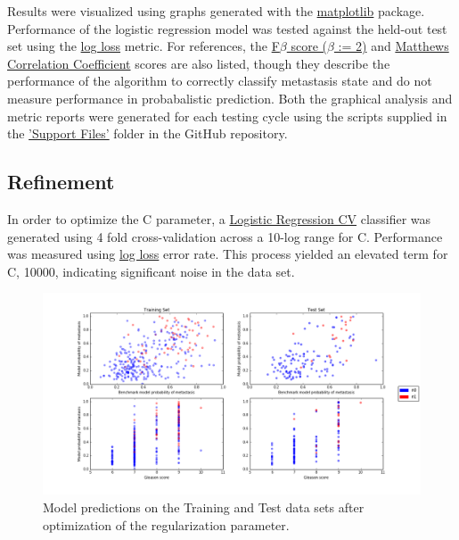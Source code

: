 \documentclass[final]{article}
\begin{document}
Results were visualized using graphs generated with the
\href{http://matplotlib.org/index.html}{matplotlib} package.  Performance of the
logistic regression model was tested against the held-out test set using the
\href{http://scikit-learn.org/stable/modules/generated/sklearn.metrics.log_loss.html#sklearn.metrics.log_loss}{log
loss} metric.  For references, the
\href{http://scikit-learn.org/stable/modules/generated/sklearn.metrics.fbeta_score.html}{F$\beta$
score ($\beta$ := 2)} and
\href{http://scikit-learn.org/stable/modules/generated/sklearn.metrics.matthews_corrcoef.html}{Matthews
Correlation Coefficient} scores are also listed, though they describe the
performance of the algorithm to correctly classify metastasis state and do not
measure performance in probabalistic prediction.  Both the graphical analysis
and metric reports were generated for each testing cycle using the scripts
supplied in the
\href{https://github.com/CCThompson82/MLE_capstone/tree/master/Support%20Files}{'Support
Files'} folder in the GitHub repository.

\subsection{Refinement}

In order to optimize the C parameter, a \href{http://scikit-learn.org/stable/modules/generated/sklearn.linear_model.LogisticRegressionCV.html#sklearn.linear_model.LogisticRegressionCV}{Logistic Regression CV}
classifier was generated using 4 fold cross-validation across a 10-log range for C.
Performance was measured using \href{http://scikit-learn.org/stable/modules/generated/sklearn.metrics.log_loss.html#sklearn.metrics.log_loss}{log loss}
error rate.  This process yielded an elevated term for C, 10000, indicating significant noise in the data set.

\begin{figure} [h!]
  \centering
    \includegraphics[width=\textwidth]{optPC3}
    \caption{\label{fig:PC3}Model predictions on the Training and Test data sets after optimization of the regularization parameter.  }
\end{figure}
\end{document}

